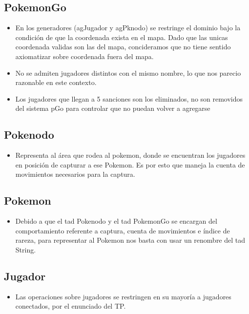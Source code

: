 
\subsection{PokemonGo}

\begin{itemize}
\item{En los generadores (agJugador y agPknodo) se restringe el dominio bajo la condici\'on de que la coordenada exista en el mapa. Dado que las unicas coordenada validas son las del mapa, concideramos que no tiene sentido axiomatizar sobre coordenada fuera del mapa.}

\item{No se admiten jugadores distintos con el mismo nombre, lo que nos parecio razonable en este contexto.}

\item{Los jugadores que llegan a 5 sanciones son los eliminados, no son removidos del sistema pGo para controlar que no puedan volver a agregarse}

\end{itemize}


\subsection{Pokenodo}

\begin{itemize}
\item{Representa al \'area que rodea al pokemon, donde se encuentran los jugadores en posici\'on de capturar a ese Pokemon. Es por esto que maneja la cuenta de movimientos necesarios para la captura.}
\end{itemize}

\subsection{Pokemon}

\begin{itemize}
\item{Debido a que el tad Pokenodo y el tad PokemonGo se encargan del comportamiento referente a captura, cuenta de movimientos e \'indice de rareza, para representar al Pokemon nos basta con usar un renombre del tad String.}
\end{itemize}

\subsection{Jugador}

\begin{itemize}
\item{Las operaciones sobre jugadores se restringen en su mayor\'ia a jugadores conectados, por el enunciado del TP.}
\end{itemize}

